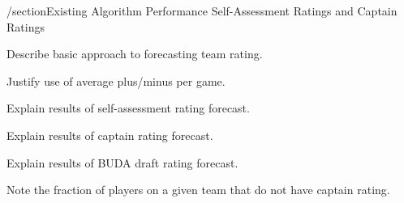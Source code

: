 /section{Existing Algorithm Performance Self-Assessment Ratings and Captain Ratings}

Describe basic approach to forecasting team rating.

Justify use of average plus/minus per game.

Explain results of self-assessment rating forecast.

Explain results of captain rating forecast.

Explain results of BUDA draft rating forecast.

Note the fraction of players on a given team that do not have captain rating.